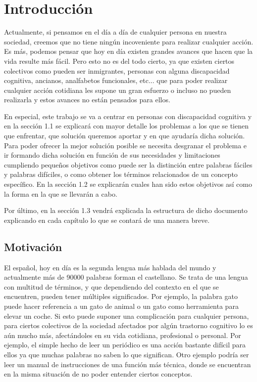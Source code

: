 \chapter{Introducción}
\label{cap:introduccion}

Actualmente, si pensamos en el día a día de cualquier persona en nuestra sociedad, creemos que no tiene ningún incoveniente para realizar cualquier acción. Es más, podemos pensar que hoy en día existen grandes avances que hacen que la vida resulte más fácil.
Pero esto no es del todo cierto, ya que existen ciertos colectivos como pueden ser inmigrantes, personas con alguna discapacidad cognitiva, ancianos, analfabetos funcionales, etc... que para poder realizar cualquier acción cotidiana les supone un gran esfuerzo o incluso no pueden realizarla y estos avances no están pensados para ellos.

En especial, este trabajo se va a centrar en personas con discapacidad cognitiva y en la sección 1.1 se explicará con mayor detalle los problemas a los que se tienen que enfrentar, que solución queremos aportar y en que ayudaría dicha solución.
Para poder ofrecer la mejor solución posible se necesita desgranar el problema e ir formando dicha solución en función de sus necesidades y limitaciones cumpliendo pequeños objetivos como puede ser la distinción entre palabras fáciles y palabras difíciles, o como obtener los términos relacionados de un concepto específico. En la sección 1.2 se explicarán cuales han sido estos objetivos así como la forma en la que se llevarán a cabo.

Por último, en la sección 1.3 vendrá explicada la estructura de dicho documento explicando en cada capítulo lo que se contará de una manera breve.


\section{Motivación}
\label{cap:sec:motivacion}

El español, hoy en día es la segunda lengua más hablada del mundo y actualmente más de 90000 palabras forman el castellano. 
Se trata de una lengua con multitud de términos, y que dependiendo del contexto en el que se encuentren, pueden tener múltiples significados. Por ejemplo, la palabra gato puede hacer referencia a un gato de animal o un gato como herramienta para elevar un coche.
Si esto puede suponer una complicación para cualquier persona, para ciertos colectivos de la sociedad afectados por algún trastorno cognitivo lo es aún mucho más, afectándoles en su vida cotidiana, profesional o personal. Por ejemplo, el simple hecho de leer un periódico es una acción bastante difícil para ellos ya que muchas palabras no saben lo que significan. Otro ejemplo podría ser leer un manual de instrucciones de una función más técnica, donde se encuentran en la misma situación de no poder entender ciertos conceptos.


